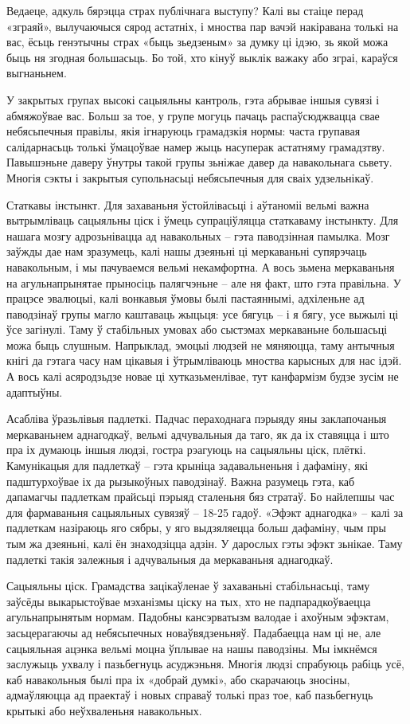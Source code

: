 Ведаеце, адкуль бярэцца страх публічнага выступу? Калі вы стаіце перад «зграяй», вылучаючыся сярод астатніх, і мноства пар вачэй накіравана толькі на вас, ёсьць генэтычны страх «быць зьедзеным» за думку ці ідэю, зь якой можа быць ня згодная большасьць. Бо той, хто кінуў выклік важаку або зграі, караўся выгнаньнем.

У закрытых групах высокі сацыяльны кантроль, гэта абрывае іншыя сувязі і абмяжоўвае вас. Больш за тое, у групе могуць пачаць распаўсюджвацца свае небясьпечныя правілы, якія ігнаруюць грамадзкія нормы: часта групавая салідарнасьць толькі ўмацоўвае намер жыць насуперак астатняму грамадзтву. Павышэньне даверу ўнутры такой групы зьніжае давер да навакольнага сьвету. Многія сэкты і закрытыя супольнасьці небясьпечныя для сваіх удзельнікаў.

Статкавы інстынкт. Для захаваньня ўстойлівасьці і аўтаноміі вельмі важна вытрымліваць сацыяльны ціск і ўмець супраціўляцца статкаваму інстынкту. Для нашага мозгу адрозьнівацца ад навакольных – гэта паводзінная памылка. Мозг заўжды дае нам зразумець, калі нашы дзеяньні ці меркаваньні супярэчаць навакольным, і мы пачуваемся вельмі некамфортна. А вось зьмена меркаваньня на агульнапрынятае прыносіць палягчэньне – але ня факт, што гэта правільна. У працэсе эвалюцыі, калі вонкавыя ўмовы былі пастаяннымі, адхіленьне ад паводзінаў групы магло каштаваць жыцьця: усе бягуць – і я бягу, усе выжылі ці ўсе загінулі. Таму ў стабільных умовах або сыстэмах меркаваньне большасьці можа быць слушным. Напрыклад, эмоцыі людзей не мяняюцца, таму антычныя кнігі да гэтага часу нам цікавыя і ўтрымліваюць мноства карысных для нас ідэй. А вось калі асяродзьдзе новае ці хутказьменлівае, тут канфармізм будзе зусім не адаптыўны.

Асабліва ўразьлівыя падлеткі. Падчас пераходнага пэрыяду яны заклапочаныя меркаваньнем аднагодкаў, вельмі адчувальныя да таго, як да іх ставяцца і што пра іх думаюць іншыя людзі, гостра рэагуюць на сацыяльны ціск, плёткі. Камунікацыя для падлеткаў – гэта крыніца задавальненьня і дафаміну, які падштурхоўвае іх да рызыкоўных паводзінаў. Важна разумець гэта, каб дапамагчы падлеткам прайсьці пэрыяд сталеньня бяз стратаў. Бо найлепшы час для фармаваньня сацыяльных сувязяў – 18-25 гадоў. «Эфэкт аднагодка» – калі за падлеткам назіраюць яго сябры, у яго выдзяляецца больш дафаміну, чым пры тым жа дзеяньні, калі ён знаходзіцца адзін. У дарослых гэты эфэкт зьнікае. Таму падлеткі такія залежныя і адчувальныя да меркаваньня аднагодкаў.

Сацыяльны ціск. Грамадства зацікаўленае ў захаваньні стабільнасьці, таму заўсёды выкарыстоўвае мэханізмы ціску на тых, хто не падпарадкоўваецца агульнапрынятым нормам. Падобны кансэрватызм валодае і ахоўным эфэктам, засьцерагаючы ад небясьпечных новаўвядзеньняў. Падабаецца нам ці не, але сацыяльная ацэнка вельмі моцна ўплывае на нашы паводзіны. Мы імкнёмся заслужыць ухвалу і пазьбегнуць асуджэньня. Многія людзі спрабуюць рабіць усё, каб навакольныя былі пра іх «добрай думкі», або скарачаюць зносіны, адмаўляюцца ад праектаў і новых справаў толькі праз тое, каб пазьбегнуць крытыкі або неўхваленьня навакольных.

